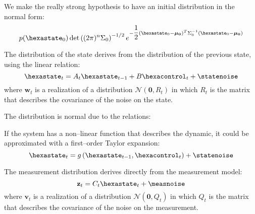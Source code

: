 We make the really strong hypothesis to have an initial distribution in the normal form:
\begin{equation}
p(\hexastate_0) \det\braces{(2\pi)^{n}\Sigma_0}^{-1/2} e^{-\dfrac{1}{2}\braces{\hexastate_0 - \boldsymbol{\mu_0}}^T \Sigma_{0}^{-1}\braces{\hexastate_0 - \boldsymbol{\mu_0}}}
\end{equation}

The distribution of the state derives from the distribution of the previous state, using the linear relation:
\begin{equation}
\hexastate_t = A_t \hexastate_{t-1} + B \hexacontrol_t + \statenoise
\end{equation}
where ${\mathbf{w}_t}$ is a realization of a distribution ${\mathcal{N}(\mathbf{0},R_t)}$ in which $R_t$ is the matrix that describes the covariance of the noise on the state.

The distribution is normal due to the relations:

If the system has a non--linear function that describes the dynamic, it could be approximated with a first--order Taylor expansion:
\begin{equation}
\hexastate_t = g\braces{\hexastate_{t-1},\hexacontrol_t} + \statenoise
\end{equation}

The measurement distribution derives directly from the measurement model:
\begin{equation}
\mathbf{z}_t = C_t \hexastate_t + \measnoise
\end{equation}
where ${\mathbf{v}_t}$ is a realization of a distribution ${\mathcal{N}(\mathbf{0},Q_t)}$ in which $Q_t$ is the matrix that describes the covariance of the noise on the measurement.

